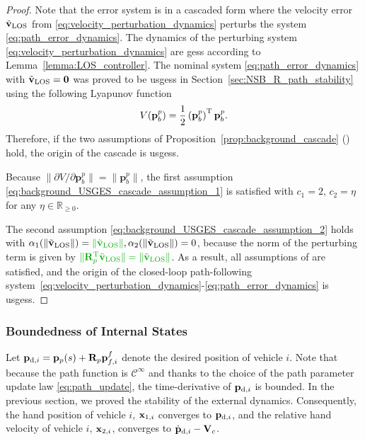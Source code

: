 \begin{proof}
    Note that the error system is in a cascaded form where the velocity error $\Tilde{\mathbf{v}}_{\rm LOS}$ from \eqref{eq:velocity_perturbation_dynamics} perturbs the system \eqref{eq:path_error_dynamics}. The dynamics of the perturbing system \eqref{eq:velocity_perturbation_dynamics} are \glspl{ges} according to Lemma~\ref{lemma:LOS_controller}. The nominal system \eqref{eq:path_error_dynamics} with $\Tilde{\mathbf{v}}_{\rm LOS}=\mathbf{0}$ was proved to be \glspl{usges} in Section~\ref{sec:NSB_R_path_stability} using the following Lyapunov function
\begin{equation}
    V(\mathbf{p}_b^p) = \frac{1}{2}\left(\mathbf{p}_b^p\right)^{\mathrm{T}}\mathbf{p}_b^p.
\end{equation}
Therefore, if the two assumptions of Proposition~\ref{prop:background_cascade} (\cite[Proposition 9]{pettersen_lyapunov_2017}) hold, the origin of the cascade is \glspl{usges}.

Because $\|\partial V/\partial \mathbf{p}_b^p\| = \|\mathbf{p}_b^p\|$, the first assumption \eqref{eq:background_USGES_cascade_assumption_1} is satisfied with $c_1 = 2, \, c_2 = \eta$ for any $\eta \in \mathbb{R}_{\geq 0}$.

The second assumption \eqref{eq:background_USGES_cascade_assumption_2} holds with $\alpha_1(\|\Tilde{\mathbf{v}}_{\rm LOS}\|) = \dm{\|\Tilde{\mathbf{v}}_{\rm LOS}\|}, \alpha_2(\|\Tilde{\mathbf{v}}_{\rm LOS}\|) = 0$, because the norm of the perturbing term is given by $\dm{\|\mathbf{R}_p\T \Tilde{\mathbf{v}}_{\rm LOS}\| = \|\Tilde{\mathbf{v}}_{\rm LOS}\|}$. As a result, all assumptions of \cite[Proposition 9]{pettersen_lyapunov_2017} are satisfied, and the origin of the closed-loop path-following system~\eqref{eq:velocity_perturbation_dynamics}-\eqref{eq:path_error_dynamics} is \glspl{usges}.
\end{proof}


\subsubsection{Boundedness of Internal States}
Let $\mathbf{p}_{{\rm d}, i} = \mathbf{p}_p(s) + \mathbf{R}_p\mathbf{p}_{f, i}^f$ denote the desired position of vehicle $i$. Note that because the path function is $\mathcal{C}^{\infty}$ and thanks to the choice of the path parameter update law \eqref{eq:path_update}, the time-derivative of $\mathbf{p}_{{\rm d}, i}$ is bounded.
In the previous section, we proved the stability of the external dynamics.
Consequently, the hand position of vehicle $i$, $\mathbf{x}_{1, i}$ converges to $\mathbf{p}_{{\rm d}, i}$, and the relative hand velocity of vehicle $i$, $\mathbf{x}_{2, i}$, converges to $\dot{\mathbf{p}}_{{\rm d}, i} - \mathbf{V}_c$.

